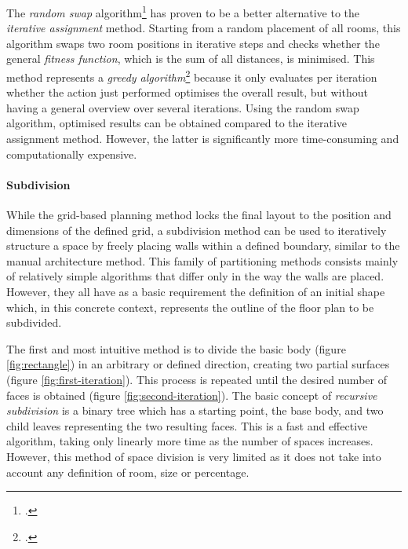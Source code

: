 \documentclass[a4paper, 12pt]{report}
\begin{document}
The \textit{random swap} algorithm\footcite{nagy2021ai} has proven to be a better alternative to the \textit{iterative assignment} method. Starting from a random placement of all rooms, this algorithm swaps two room positions in iterative steps and checks whether the general \textit{\gls{fitness function}}, which is the sum of all distances, is minimised. This method represents a \textit{\gls{greedy algorithm}}\footcite{nisztuk2019hybrid} because it only evaluates per iteration whether the action just performed optimises the overall result, but without having a general overview over several iterations. Using the random swap algorithm, optimised results can be obtained compared to the iterative assignment method. However, the latter is significantly more time-consuming and computationally expensive.

\paragraph{Subdivision}\label{par:subdivision}

While the grid-based planning method locks the final layout to the position and dimensions of the defined grid, a subdivision method can be used to iteratively structure a space by freely placing walls within a defined boundary, similar to the manual architecture method. This family of partitioning methods consists mainly of relatively simple algorithms that differ only in the way the walls are placed. However, they all have as a basic requirement the definition of an initial shape which, in this concrete context, represents the outline of the floor plan to be subdivided.

The first and most intuitive method is to divide the basic body (figure \ref{fig:rectangle}) in an arbitrary or defined direction, creating two partial surfaces (figure \ref{fig:first-iteration}). This process is repeated until the desired number of faces is obtained (figure \ref{fig:second-iteration}). The basic concept of \textit{recursive subdivision} is a \gls{binary tree} which has a starting point, the base body, and two child leaves representing the two resulting faces. This is a fast and effective algorithm, taking only linearly more time as the number of spaces increases. However, this method of space division is very limited as it does not take into account any definition of room, size or percentage.
\end{document}
